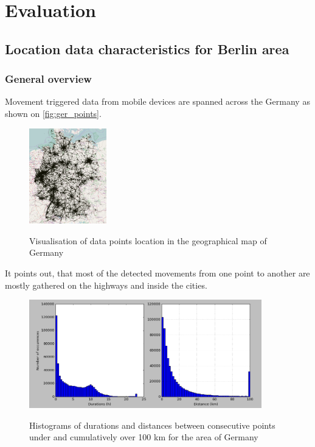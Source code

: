 \chapter{Evaluation}
\label{cha:evaluation}
 
\section{Location data characteristics for Berlin area}

\subsection{General overview}

Movement triggered data from mobile devices are spanned across the Germany as shown on \autoref{fig:ger_points}. 
\begin{figure}[!ht]
	\centering
	\includegraphics[width=0.3\textwidth]{images/points_germany.png}\\
	\caption{Visualisation of data points location in the geographical map of Germany}
	\label{fig:ger_points}
\end{figure}
\FloatBarrier
It points out, that most of the detected movements from one point to another are mostly gathered on the highways and inside the cities. 
\\
\begin{figure}[!ht]
	\centering
	\includegraphics[width=0.9\textwidth]{images/germany_stats.png}\\
	\caption{Histograms of durations and distances between consecutive points under and cumulatively over 100 km for the area of Germany}
	\label{fig:ger_stats}
\end{figure}
